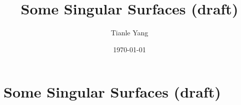 \documentclass{noteformyself}
\title{Some Singular Surfaces (draft)}
\author{Tianle Yang}
\date{\today}
\begin{document}
    \maketitle

    \section{Some Singular Surfaces (draft)}


\end{document}
